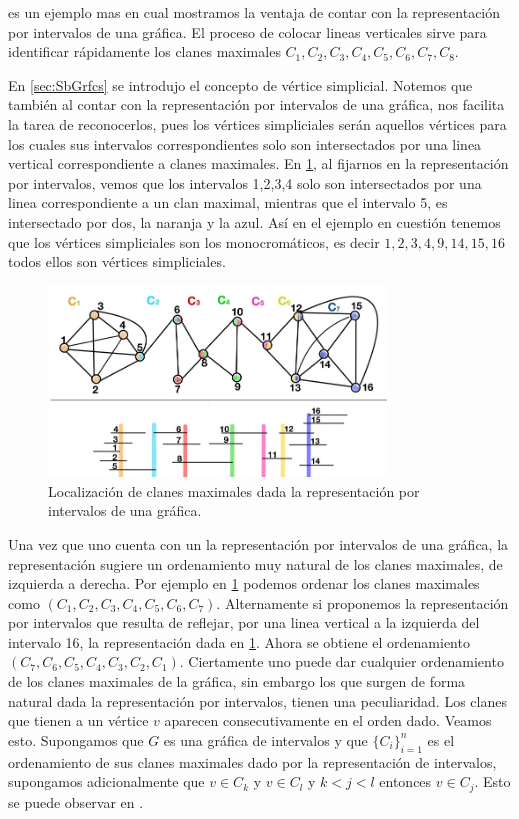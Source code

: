  es un ejemplo mas en cual mostramos la ventaja de contar con la representación por intervalos de una gráfica. El proceso de colocar lineas verticales sirve para identificar rápidamente los clanes maximales $C_1,C_2, C_3, C_4, C_5, C_6, C_7, C_8$.

En \cref{sec:SbGrfcs} se introdujo el concepto de vértice simplicial. Notemos que también al contar con la representación por intervalos de una gráfica, nos facilita la tarea de reconocerlos, pues los vértices simpliciales serán aquellos vértices para los cuales sus intervalos  correspondientes solo son intersectados por una linea vertical correspondiente a clanes maximales. En \cref{fig:MaxClqs02}, al fijarnos en la representación por intervalos, vemos que los intervalos 1,2,3,4 solo son intersectados por una linea correspondiente a un clan maximal, mientras que el intervalo 5, es intersectado por dos, la naranja y la azul. Así en el ejemplo en cuestión tenemos que los vértices simpliciales son los monocrom\'aticos, es decir $1,2,3,4,9,14,15,16$ todos ellos son vértices simpliciales.

\begin{figure}[H]
  \centering
  \includegraphics[width=0.8\textwidth]{recursos/capturas/209.jpg}
  \caption{Localización de clanes maximales dada la representación por intervalos de una gráfica.}
  \label{fig:MaxClqs02}
\end{figure}

Una vez que uno cuenta con un la representación por intervalos de una gráfica, la representación sugiere un ordenamiento muy natural de los clanes maximales, de izquierda a derecha. Por ejemplo en \cref{fig:MaxClqs02} podemos ordenar los clanes maximales como $(C_1,C_2, C_3, C_4, C_5, C_6, C_7)$. Alternamente si proponemos la representación por intervalos que resulta de reflejar, por una linea vertical a la izquierda del intervalo 16, la representación dada en \cref{fig:MaxClqs02}. Ahora se obtiene el ordenamiento $(C_7,C_6,C_5,C_4,C_3,C_2,C_1)$. Ciertamente uno puede dar cualquier ordenamiento de los clanes maximales de la gráfica, sin embargo los que surgen de forma natural dada la representación por intervalos, tienen una peculiaridad. Los clanes que tienen a un vértice $v$ aparecen consecutivamente en el orden dado. Veamos esto. Supongamos que $G$ es una gráfica de intervalos y que $\{C_i\}_{i=1} ^n$ es el ordenamiento de sus clanes maximales dado por la representación de intervalos, supongamos adicionalmente que $v\in C_k$ y $v\in C_l$ y $k<j<l$ entonces $v\in C_j$. Esto se puede observar en . 




